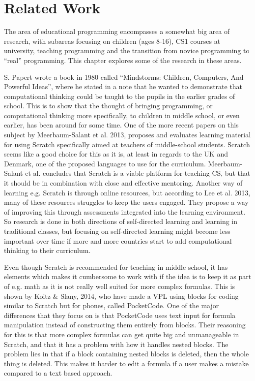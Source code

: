 \chapter{Related Work}
\label{chap:related_work}
The area of educational programming encompasses a somewhat big area of research, with subareas focusing on children (ages 8-16), CS1 courses at university, teaching programming and the transition from novice programming to ``real'' programming. This chapter explores some of the research in these areas.

S. Papert wrote a book in 1980 called ``Mindstorms: Children, Computers, And Powerful Ideas''\cite{s_papert}, where he stated in a note that he wanted to demonstrate that computational thinking could be taught to the pupils in the earlier grades of school\cite{turtle_origin}. This is to show that the thought of bringing programming, or computational thinking more specifically, to children in middle school, or even earlier, has been around for some time. One of the more recent papers on this subject by Meerbaum-Salant et al. 2013\cite{learning_computer_scratch}, proposes and evaluates learning material for using Scratch specifically aimed at teachers of middle-school students. Scratch seems like a good choice for this as it is, at least in regards to the UK and Denmark, one of the proposed languages to use for the curriculum\cite{uk_scratch}\cite{dk_scratch}. Meerbaum-Salant et al. concludes that Scratch is a viable platform for teaching CS, but that it should be in combination with close and effective mentoring. Another way of learning e.g. Scratch is through online resources, but according to Lee et al. 2013\cite{ingame_assessment}, many of these resources struggles to keep the users engaged. They propose a way of improving this through assessments integrated into the learning environment. So research is done in both directions of self-directed learning and learning in traditional classes, but focusing on self-directed learning might become less important over time if more and more countries start to add computational thinking to their curriculum.

Even though Scratch is recommended for teaching in middle school, it has elements which makes it cumbersome to work with if the idea is to keep it as part of e.g. math\cite{dk_scratch} as it is not really well suited for more complex formulas. This is shown by Koitz \& Slany, 2014\cite{KoitzSlany14}, who have made a VPL using blocks for coding similar to Scratch but for phones, called PocketCode. One of the major differences that they focus on is that PocketCode uses text input for formula manipulation instead of constructing them entirely from blocks. Their reasoning for this is that more complex formulas can get quite big and unmanageable in Scratch, and that it has a problem with how it handles nested blocks. The problem lies in that if a block containing nested blocks is deleted, then the whole thing is deleted. This makes it harder to edit a formula if a user makes a mistake compared to a text based approach.

